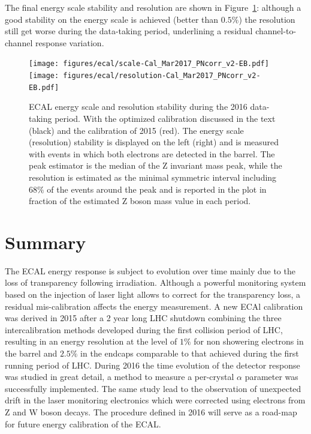 The final energy scale stability and resolution are shown in Figure~\ref{fig:final_2016}: although a good stability on
the energy scale is achieved (better than $0.5\%$) the resolution still get worse during the data-taking period, underlining
a residual channel-to-channel response variation.

\begin{figure}[h!]
  \centering
  \texttt{[image: figures/ecal/scale-Cal\_Mar2017\_PNcorr\_v2-EB.pdf]}
  \texttt{[image: figures/ecal/resolution-Cal\_Mar2017\_PNcorr\_v2-EB.pdf]}
  \caption{ECAL energy scale and resolution stability during the 2016 data-taking period. With the
    optimized calibration discussed in the text (black) and the calibration of 2015 (red).
    The energy scale (resolution) stability is displayed on the left (right) and is measured with \Zee events in
    which both electrons are detected in the barrel. The peak estimator is the median of the Z invariant mass peak, while
    the resolution is estimated as the minimal symmetric interval including $68\%$ of the events around the peak and is
    reported in the plot in fraction of the estimated Z boson mass value in each period.}
  \label{fig:final_2016}
\end{figure}


\section{Summary}
The ECAL energy response is subject to evolution over time mainly due to the loss of transparency following irradiation.
Although a powerful monitoring system based on the injection of laser light allows to correct for the transparency loss,
a residual mis-calibration affects the energy measurement. A new ECAl calibration was derived in 2015 after a 2 year long
LHC shutdown combining the three intercalibration methods developed during the first collision period of LHC,
resulting in an energy resolution at the level of $1\%$ for non showering electrons in the barrel and $2.5\%$ in the
endcaps comparable to that achieved during the first running period of LHC.
During 2016 the time evolution of the detector response was studied in great detail, a method to measure a
per-crystal $\alpha$ parameter was successfully implemented.
The same study lead to the observation of unexpected drift in
the laser monitoring electronics which were corrected using electrons from Z and W boson decays. The procedure defined in
2016 will serve as a road-map for future energy calibration of the ECAL.
    
    
  
  
  